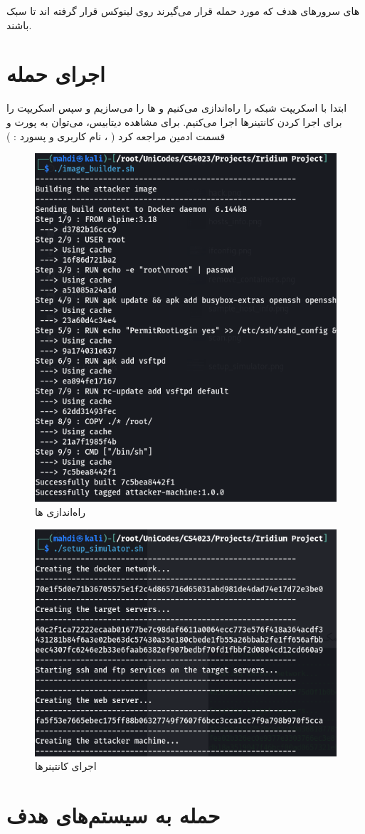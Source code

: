های سرور‌های هدف که مورد حمله قرار می‌گیرند روی لینوکس  قرار گرفته اند تا سبک باشند. 


\section{اجرای حمله}

ابتدا با اسکریپت  شبکه را راه‌اندازی می‌کنیم و ها را می‌سازیم و سپس اسکریپت  را برای اجرا کردن کانتینرها اجرا می‌کنیم. برای مشاهده دیتابیس، می‌توان به پورت  و قسمت ادمین مراجعه کرد (  ، نام کاربری و پسورد :  ) 


\begin{figure}[h!]
    \centering
    \includegraphics[width=0.5\linewidth]{images/image_builder.png}
    \caption{راه‌اندازی ها}
    \label{fig:image_builder}
\end{figure}

\begin{figure}[h!]
    \centering
    \includegraphics[width=0.5\linewidth]{images/setup_simulator.png}
    \caption{اجرای کانتینرها}
    \label{fig:setup_simulator}
\end{figure}


\section{حمله به سیستم‌های هدف}


